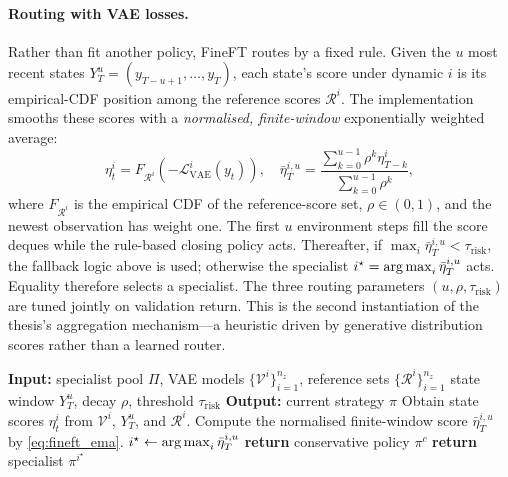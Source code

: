 \paragraph{Routing with VAE losses.} Rather than fit another policy, FineFT routes by a fixed rule. Given the $u$ most recent states $Y^u_T=(y_{T-u+1},\dots,y_T)$, each state's score under dynamic $i$ is its empirical-CDF position among the reference scores $\mathcal{R}^i$. The implementation smooths these scores with a \emph{normalised, finite-window} exponentially weighted average:
\begin{equation}
\label{eq:fineft_ema}
\eta^i_t = F_{\mathcal{R}^i}\!\left(-\mathcal{L}_{\mathrm{VAE}}^i(y_t)\right),
\quad
\bar{\eta}^{i,u}_T =
\frac{\sum_{k=0}^{u-1}\rho^k \eta^i_{T-k}}
     {\sum_{k=0}^{u-1}\rho^k},
\end{equation}
where $F_{\mathcal{R}^i}$ is the empirical CDF of the reference-score set, $\rho\in(0,1)$, and the newest observation has weight one. The first $u$ environment steps fill the score deques while the rule-based closing policy acts. Thereafter, if $\max_i \bar{\eta}^{i,u}_T<\tau_{\mathrm{risk}}$, the fallback logic above is used; otherwise the specialist $i^\star=\operatorname*{arg\,max}_i \bar{\eta}^{i,u}_T$ acts. Equality therefore selects a specialist. The three routing parameters $(u,\rho,\tau_{\mathrm{risk}})$ are tuned jointly on validation return. This is the second instantiation of the thesis's aggregation mechanism---a heuristic driven by generative distribution scores rather than a learned router.

\begin{algorithm}[!htb]
\caption{Risk-Aware Heuristic Routing}
\label{alg:fineft_routing}
\begin{algorithmic}[1]
\State \textbf{Input:} specialist pool $\Pi$, VAE models $\{\mathcal{V}^i\}_{i=1}^{n_z}$, reference sets $\{\mathcal{R}^i\}_{i=1}^{n_z}$
\Statex \hspace{\algorithmicindent} state window $Y^u_T$, decay $\rho$, threshold $\tau_{\mathrm{risk}}$
\State \textbf{Output:} current strategy $\pi$
  \State Obtain state scores $\eta^i_t$ from $\mathcal{V}^i$, $Y^u_T$, and $\mathcal{R}^i$.
  \State Compute the normalised finite-window score $\bar{\eta}^{i,u}_T$ by \eqref{eq:fineft_ema}.
\EndFor
\State $i^\star \gets \operatorname*{arg\,max}_i \bar{\eta}^{i,u}_T$
  \State \textbf{return} conservative policy $\pi^c$ 
\Else
  \State \textbf{return} specialist $\pi^{i^\star}$
\EndIf
\end{algorithmic}
\end{algorithm}

